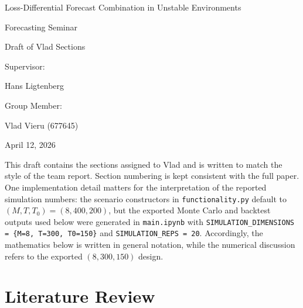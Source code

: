 \documentclass[11pt,a4paper]{article}
\begin{document}
\hypersetup{pageanchor=false}
\begin{titlepage}
\begin{center}
{\LARGE Loss-Differential Forecast Combination in Unstable Environments\par}
\vspace{0.4cm}
{\large Forecasting Seminar\par}
\vspace{1.0cm}
{\Large Draft of Vlad Sections\par}
\vspace{0.8cm}
Supervisor:\par
Hans Ligtenberg\par
\vspace{0.8cm}
Group Member:\par
Vlad Vieru (677645)\par
\vspace{0.8cm}
April 12, 2026
\end{center}

\vfill

\noindent This draft contains the sections assigned to Vlad and is written to match the style of the team report. Section numbering is kept consistent with the full paper. One implementation detail matters for the interpretation of the reported simulation numbers: the scenario constructors in \texttt{functionality.py} default to $(M,T,T_0)=(8,400,200)$, but the exported Monte Carlo and backtest outputs used below were generated in \texttt{main.ipynb} with \texttt{SIMULATION\_DIMENSIONS = \{M=8, T=300, T0=150\}} and \texttt{SIMULATION\_REPS = 20}. Accordingly, the mathematics below is written in general notation, while the numerical discussion refers to the exported $(8,300,150)$ design.
\end{titlepage}
\hypersetup{pageanchor=true}

\setcounter{section}{1}
\section{Literature Review}
\end{document}

